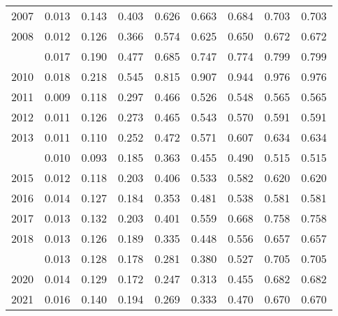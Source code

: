 \documentclass[
]{article}
\begin{document}
\begin{longtable}[t]{lrrrrrrrr}
2007 & 0.013 & 0.143 & 0.403 & 0.626 & 0.663 & 0.684 & 0.703 & 0.703\\
2008 & 0.012 & 0.126 & 0.366 & 0.574 & 0.625 & 0.650 & 0.672 & 0.672\\
\addlinespace
2009 & 0.017 & 0.190 & 0.477 & 0.685 & 0.747 & 0.774 & 0.799 & 0.799\\
2010 & 0.018 & 0.218 & 0.545 & 0.815 & 0.907 & 0.944 & 0.976 & 0.976\\
2011 & 0.009 & 0.118 & 0.297 & 0.466 & 0.526 & 0.548 & 0.565 & 0.565\\
2012 & 0.011 & 0.126 & 0.273 & 0.465 & 0.543 & 0.570 & 0.591 & 0.591\\
2013 & 0.011 & 0.110 & 0.252 & 0.472 & 0.571 & 0.607 & 0.634 & 0.634\\
\addlinespace
2014 & 0.010 & 0.093 & 0.185 & 0.363 & 0.455 & 0.490 & 0.515 & 0.515\\
2015 & 0.012 & 0.118 & 0.203 & 0.406 & 0.533 & 0.582 & 0.620 & 0.620\\
2016 & 0.014 & 0.127 & 0.184 & 0.353 & 0.481 & 0.538 & 0.581 & 0.581\\
2017 & 0.013 & 0.132 & 0.203 & 0.401 & 0.559 & 0.668 & 0.758 & 0.758\\
2018 & 0.013 & 0.126 & 0.189 & 0.335 & 0.448 & 0.556 & 0.657 & 0.657\\
\addlinespace
2019 & 0.013 & 0.128 & 0.178 & 0.281 & 0.380 & 0.527 & 0.705 & 0.705\\
2020 & 0.014 & 0.129 & 0.172 & 0.247 & 0.313 & 0.455 & 0.682 & 0.682\\
2021 & 0.016 & 0.140 & 0.194 & 0.269 & 0.333 & 0.470 & 0.670 & 0.670\\*
\end{longtable}
\end{document}
